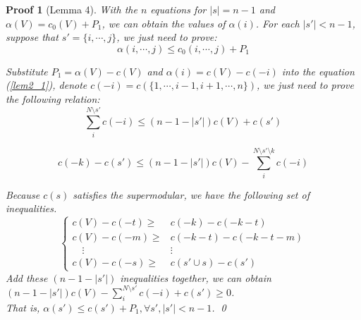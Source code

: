 \documentclass[UTF8]{article}
\newtheorem{pf}{\hspace{2em}Proof}
\begin{document}
\begin{pf}[Lemma 4]
With the $n$ equations for $\left| s \right|= n-1$ and $\alpha(V)=c_0(V)+P_1$, we can obtain the values of $\alpha(i)$. For each $\left| s' \right| < n-1$, suppose that $s'=\{i,\cdots,j\}$, we just need to prove:
\begin{equation} \label{lem2_1}
  \alpha(i,\cdots,j) \leq c_0(i,\cdots,j)+P_1
\end{equation}

Substitute $P_1=\alpha(V)-c(V)$ and $\alpha(i) = c(V)-c(-i)$ into the equation (\ref{lem2_1}), denote $c(-i)=c(\{1,\cdots,i-1,i+1,\cdots,n\})$, we just need to prove the following relation:
\begin{equation}   \label{lem2_2}
  \sum_i^{N\setminus s'} c(-i) \leq (n-1-\left| s' \right|)c(V)+c(s')
\end{equation}

\Rightarrow \qquad

\begin{equation*}
  c(-k)-c(s') \leq (n-1-\left| s' \right|)c(V)-\sum_i^{N\setminus s'\setminus k} c(-i)
\end{equation*}

Because $c(s)$ satisfies the supermodular, we have the following set of inequalities.
\[
\begin{cases}
  c(V)-c(-t) \geq & c(-k)-c(-k-t) \\
  c(V)-c(-m) \geq & c(-k-t)-c(-k-t-m) \\
 \quad   \vdots        &\vdots\\
 c(V)-c(-s) \geq & c(s' \cup s)-c(s')
\end{cases}
\]
Add these $(n-1-\left| s' \right|)$ inequalities together, we can obtain $(n-1-\left| s' \right|)c(V)- \sum_i^{N\setminus s'} c(-i)+c(s') \geq 0 $. \\
That is, $\alpha(s') \leq c(s')+P_1, \forall s', \left|s' \right|<n-1$.
\qed
\end{pf}
\end{document}
